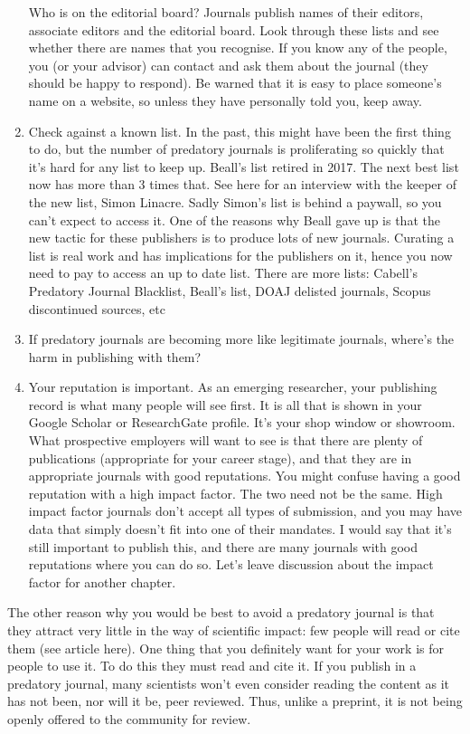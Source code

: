 \documentclass[
]{krantz}
\begin{document}
\begin{enumerate}
  Who is on the editorial board? Journals publish names of their editors, associate editors and the editorial board. Look through these lists and see whether there are names that you recognise. If you know any of the people, you (or your advisor) can contact and ask them about the journal (they should be happy to respond). Be warned that it is easy to place someone's name on a website, so unless they have personally told you, keep away.
\item
  Check against a known list. In the past, this might have been the first thing to do, but the number of predatory journals is proliferating so quickly that it's hard for any list to keep up. Beall's list retired in 2017. The next best list now has more than 3 times that. See here for an interview with the keeper of the new list, Simon Linacre. Sadly Simon's list is behind a paywall, so you can't expect to access it. One of the reasons why Beall gave up is that the new tactic for these publishers is to produce lots of new journals. Curating a list is real work and has implications for the publishers on it, hence you now need to pay to access an up to date list. There are more lists: Cabell's Predatory Journal Blacklist, Beall's list, DOAJ delisted journals, Scopus discontinued sources, etc
\item
  If predatory journals are becoming more like legitimate journals, where's the harm in publishing with them?
\item
  Your reputation is important. As an emerging researcher, your publishing record is what many people will see first. It is all that is shown in your Google Scholar or ResearchGate profile. It's your shop window or showroom. What prospective employers will want to see is that there are plenty of publications (appropriate for your career stage), and that they are in appropriate journals with good reputations. You might confuse having a good reputation with a high impact factor. The two need not be the same. High impact factor journals don't accept all types of submission, and you may have data that simply doesn't fit into one of their mandates. I would say that it's still important to publish this, and there are many journals with good reputations where you can do so. Let's leave discussion about the impact factor for another chapter.
\end{enumerate}

The other reason why you would be best to avoid a predatory journal is that they attract very little in the way of scientific impact: few people will read or cite them (see article here). One thing that you definitely want for your work is for people to use it. To do this they must read and cite it. If you publish in a predatory journal, many scientists won't even consider reading the content as it has not been, nor will it be, peer reviewed. Thus, unlike a preprint, it is not being openly offered to the community for review.
\end{document}
